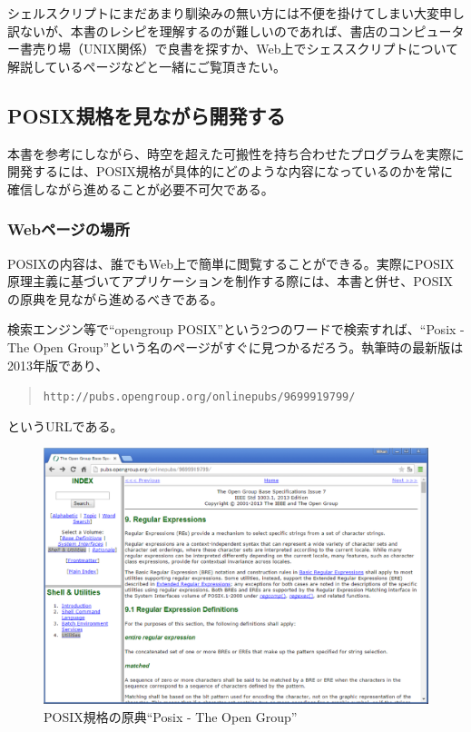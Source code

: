 シェルスクリプトにまだあまり馴染みの無い方には不便を掛けてしまい大変申し訳ないが、本書のレシピを理解するのが難しいのであれば、書店のコンピューター書売り場（UNIX関係）で良書を探すか、Web上でシェススクリプトについて解説しているページなどと一緒にご覧頂きたい。

\subsection*{POSIX規格を見ながら開発する}

本書を参考にしながら、時空を超えた可搬性を持ち合わせたプログラムを実際に開発するには、POSIX規格が具体的にどのような内容になっているのかを常に確信しながら進めることが必要不可欠である。

\subsubsection*{Webページの場所}

POSIXの内容は、誰でもWeb上で簡単に閲覧することができる。実際にPOSIX原理主義に基づいてアプリケーションを制作する際には、本書と併せ、POSIXの原典を見ながら進めるべきである。

検索エンジン等で``opengroup POSIX''という2つのワードで検索すれば、``Posix - The Open Group''という名のページがすぐに見つかるだろう。執筆時の最新版は2013年版であり、
\begin{quotation}
\verb|http://pubs.opengroup.org/onlinepubs/9699919799/|
\end{quotation}
というURLである。

\begin{figure}[htb]
	\begin{center}
		\vspace{10mm}
		\includegraphics*[scale=0.30]{tex/0_introduction/figs/POSIX_web.eps}
		\vspace{0mm}
		\caption{POSIX規格の原典“Posix - The Open Group”}
		\label{fig:POSIX_web}
		\vspace{0mm}
	\end{center}
\end{figure}

